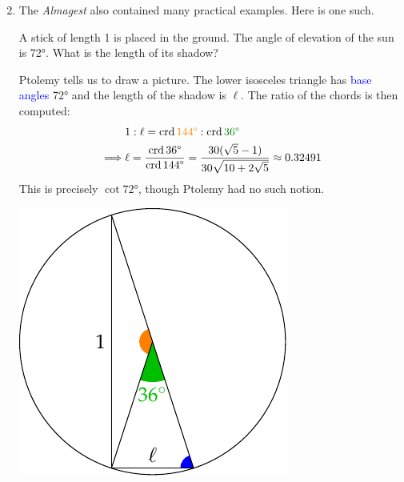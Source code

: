 \begin{enumerate}\setcounter{enumi}{1}
  \item The \emph{Almagest} also contained many practical examples. Here is one such.\par
	\begin{minipage}[t]{0.65\linewidth}\vspace{-10pt}
		A stick of length 1 is placed in the ground. The angle of elevation of the sun is \ang{72}. What is the length of its shadow?\smallbreak
		
		Ptolemy tells us to draw a picture. The lower isosceles triangle has \textcolor{blue}{base angles} \ang{72} and the length of the shadow is $\ell$. The ratio of the chords is then computed:
		\begin{align*}
			&1:\ell=\crd \textcolor{orange}{\ang{144}}:\crd \textcolor{Green}{\ang{36}}\\
			\implies &\ell=\frac{\crd \ang{36}}{\crd \ang{144}}=\frac{30(\sqrt 5-1)}{30\sqrt{10+2\sqrt 5}}\approx 0.32491
		\end{align*}
		This is precisely $\cot \ang{72}$, though Ptolemy had no such notion.
	\end{minipage}
	\hfill
	\begin{minipage}[t]{0.34\linewidth}\vspace{-5pt}
		\flushright\includegraphics[scale=0.85]{trig-anglesun}
	\end{minipage}
\end{enumerate}


